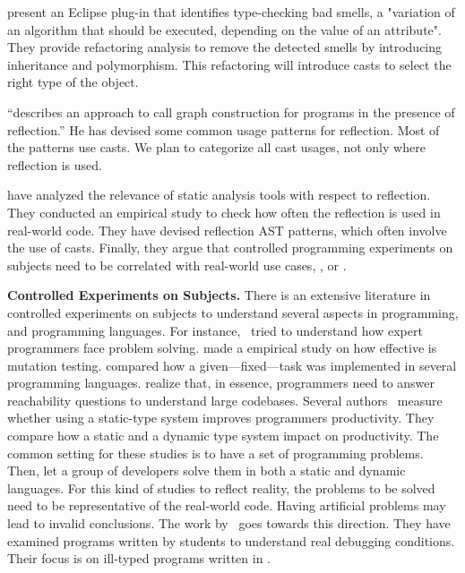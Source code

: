 \cite{tsantalisJDeodorantIdentificationRemoval2008} present an
Eclipse plug-in that identifies type-checking bad smells,
a "variation of an algorithm that should be executed,
depending on the value of an attribute".
They provide refactoring analysis to remove the detected smells
by introducing inheritance and polymorphism.
This refactoring will introduce casts to select
the right type of the object.

\cite{livshitsImprovingSoftwareSecurity2006,livshitsReflectionAnalysisJava2005} ``describes an approach to call graph construction for \java{} programs in the presence of reflection.''
He has devised some common usage patterns for reflection.
Most of the patterns use casts.
We plan to categorize all cast usages,
not only where reflection is used.

\cite{landmanChallengesStaticAnalysis2017} have analyzed the relevance of
static analysis tools with respect to reflection.
They conducted an empirical study to check how often the reflection
\api{} is used in real-world code.
They have devised reflection AST patterns,
which often involve the use of casts.
Finally, they argue that controlled programming experiments on
subjects need to be correlated with real-world use cases,
\eg, \github{} or \mavencentral{}.

\textbf{Controlled Experiments on Subjects.}
There is an extensive literature \perse{} in controlled experiments on subjects to understand several aspects in programming, and programming languages.
For instance,~\cite{solowayEmpiricalStudiesProgramming1984} tried to understand how expert programmers face problem solving.
\cite{buddTheoreticalEmpiricalStudies1980} made a empirical study on how effective is mutation testing.
\cite{precheltEmpiricalComparisonSeven2000} compared how a given---fixed---task was implemented in several programming languages.
\cite{latozaDevelopersAskReachability2010} realize that, in essence, programmers need to answer reachability questions to understand large codebases.
Several authors~\cite{stuchlikStaticVsDynamic2011,mayerEmpiricalStudyInfluence2012,harlinImpactUsingStaticType2017} measure whether using a static-type system improves programmers productivity.
They compare how a static and a dynamic type system impact on productivity.
The common setting for these studies is to have a set of programming problems.
Then, let a group of developers solve them in both a static and dynamic languages.
For this kind of studies to reflect reality, the problems to be solved need to be representative of the real-world code.
Having artificial problems may lead to invalid conclusions.
The work by~\cite{wuHowTypeErrors2017,wuLearningUserFriendly2017} goes towards this direction. 
They have examined programs written by students to understand real debugging conditions. 
Their focus is on ill-typed programs written in \haskell{}.
